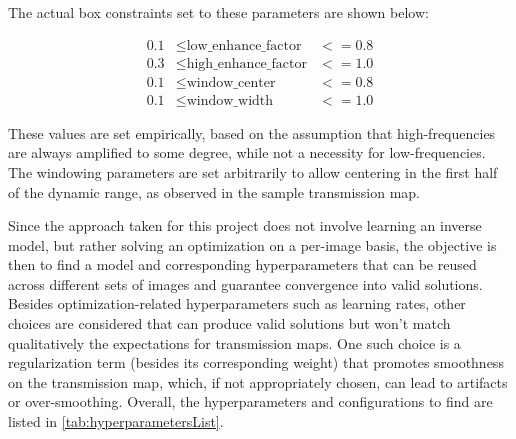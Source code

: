 \documentclass[nomenclature, english, bibtex]{kththesis}
\numberwithin{listing}{chapter}
\begin{document}
The actual box constraints set to these parameters are shown below:

\begin{equation}
\begin{aligned}
    0.1 & \leq  \text{low\_enhance\_factor} & <= 0.8 \\
    0.3 & \leq  \text{high\_enhance\_factor} & <= 1.0 \\
    0.1 & \leq  \text{window\_center} & <= 0.8 \\
    0.1 & \leq  \text{window\_width} & <= 1.0
\end{aligned}
\end{equation}

These values are set empirically, based on the assumption that high-frequencies are always amplified to some degree,
while not a necessity for low-frequencies. The windowing parameters are set arbitrarily to allow centering in the first
half of the dynamic range, as observed in the sample transmission map.

Since the approach taken for this project does not involve learning an inverse model, but rather solving an optimization
on a per-image basis, the objective is then to find a model and corresponding hyperparameters that can be reused across different
sets of images and guarantee convergence into valid solutions. Besides optimization-related hyperparameters such as
learning rates, other choices are considered that can produce valid solutions but won't match qualitatively
the expectations for transmission maps. One such choice is a regularization term (besides its corresponding weight)
that promotes smoothness on the transmission map, which, if not appropriately chosen, can lead to artifacts or over-smoothing.
Overall, the hyperparameters and configurations to find are listed in \autoref{tab:hyperparametersList}.
\end{document}
